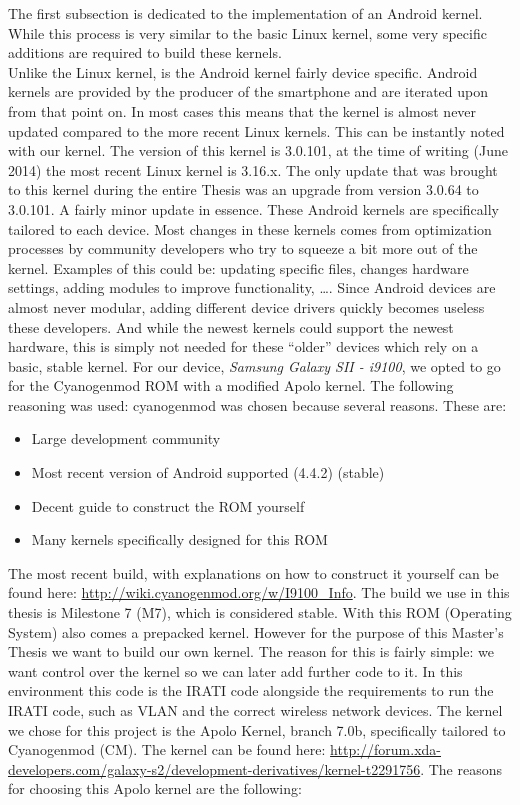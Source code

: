 The first subsection is dedicated to the implementation of an Android kernel. While this process is very similar to the basic Linux kernel, some very specific additions are required to build these kernels. 
\\
Unlike the Linux kernel, is the Android kernel fairly device specific. Android kernels are provided by the producer of the smartphone and are iterated upon from that point on. In most cases this means that the kernel is almost never updated compared to the more recent Linux kernels. This can be instantly noted with our kernel. The version of this kernel is 3.0.101, at the time of writing (June 2014) the most recent Linux kernel is 3.16.x. The only update that was brought to this kernel during the entire Thesis was an upgrade from version 3.0.64 to 3.0.101. A fairly minor update in essence. These Android kernels are specifically tailored to each device. Most changes in these kernels comes from optimization processes by community developers who try to squeeze a bit more out of the kernel. Examples of this could be: updating specific files, changes hardware settings, adding modules to improve functionality, \ldots. Since Android devices are almost never modular, adding different device drivers quickly becomes useless these developers. And while the newest kernels could support the newest hardware, this is simply not needed for these ``older'' devices which rely on a basic, stable kernel. 
\npar
For our device, \emph{Samsung Galaxy SII - i9100}, we opted to go for the Cyanogenmod ROM with a modified Apolo kernel. The following reasoning was used: cyanogenmod was chosen because several reasons. These are:

\begin{itemize}
	\item Large development community
	\item Most recent version of Android supported (4.4.2) (stable)
	\item Decent guide to construct the ROM yourself
	\item Many kernels specifically designed for this ROM
\end{itemize}

The most recent build, with explanations on how to construct it yourself can be found here: \url{http://wiki.cyanogenmod.org/w/I9100\_Info}. The build we use in this thesis is Milestone 7 (M7), which is considered stable. With this ROM (Operating System) also comes a prepacked kernel. However for the purpose of this Master's Thesis we want to build our own kernel. The reason for this is fairly simple: we want control over the kernel so we can later add further code to it. In this environment this code is the IRATI code alongside the requirements to run the IRATI code, such as VLAN and the correct wireless network devices. 
\npar
The kernel we chose for this project is the Apolo Kernel, branch 7.0b, specifically tailored to Cyanogenmod (CM). The kernel can be found here: \url{http://forum.xda-developers.com/galaxy-s2/development-derivatives/kernel-t2291756}. The reasons for choosing this Apolo kernel are the following:

